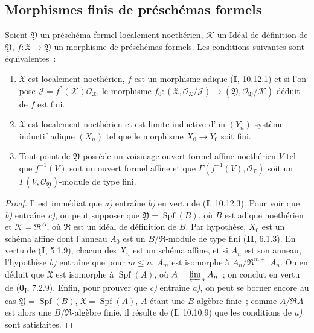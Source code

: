 \subsection{Morphismes finis de préschémas formels}

\begin{proposition}[4.8.1]
\label{III.4.8.1-fr}
Soient $\mathfrak Y$ un préschéma formel localement noethérien, $\mathcal K$ un
Idéal de définition de $\mathfrak Y$, $f:\mathfrak X\to\mathfrak Y$ un
morphisme de préschémas formels. Les conditions suivantes sont équivalentes~:
\begin{enumerate}
\item[a)] $\mathfrak X$ est localement noethérien, $f$ est un morphisme adique
  \textup{(\textbf{I}, 10.12.1)} et si l'on pose
  $\mathcal J=f^*(\mathcal K)\mathcal O_{\mathfrak X}$, le morphisme
  $f_0:(\mathfrak X,\mathcal O_{\mathfrak X}/\mathcal J)
  \longrightarrow
  (\mathfrak Y,\mathcal O_{\mathfrak Y}/\mathcal K)$
  déduit de $f$ est fini.
\item[b)] $\mathfrak X$ est localement noethérien et est limite inductive d'un
  $(Y_n)$-système inductif adique $(X_n)$ tel que le morphisme
  $X_0\to Y_0$ soit fini.
\item[c)] Tout point de $\mathfrak Y$ possède un voisinage ouvert formel affine
  noethérien $V$ tel que $f^{-1}(V)$ soit un ouvert formel affine et que
  $\Gamma(f^{-1}(V),\mathcal O_{\mathfrak X})$ soit un
  $\Gamma(V,\mathcal O_{\mathfrak Y})$-module de type fini.
\end{enumerate}
\end{proposition}

\begin{proof}
Il est immédiat que \emph{a)} entraîne \emph{b)} en vertu de (\textbf{I}, 10.12.3). Pour voir que \emph{b)}
entraîne \emph{c)}, on peut supposer que
$\mathfrak Y=\operatorname{Spf}(B)$, où $B$ est adique noethérien et
$\mathcal K=\mathfrak R^\Delta$, où $\mathfrak R$ est un idéal de définition
de $B$. Par hypothèse, $X_0$ est un schéma affine dont l'anneau $A_0$ est un
$B/\mathfrak R$-module de type fini (\textbf{II}, 6.1.3). En vertu de (\textbf{I}, 5.1.9), chacun
des $X_n$ est un schéma affine, et si $A_n$ est son anneau, l'hypothèse \emph{b)}
entraîne que pour $m\leq n$, $A_m$ est isomorphe à
$A_n/\mathfrak R^{m+1}A_n$. On en déduit que $\mathfrak X$ est isomorphe à
$\operatorname{Spf}(A)$, où $A=\varprojlim_n A_n$~; on conclut en vertu de
(\textbf{0}\textsubscript{I}, 7.2.9). Enfin, pour prouver que \emph{c)}
entraîne \emph{a)}, on peut se borner encore au cas
$\mathfrak Y=\operatorname{Spf}(B)$, $\mathfrak X=\operatorname{Spf}(A)$,
$A$ étant une $B$-algèbre finie~; comme $A/\mathfrak RA$ est alors une
$B/\mathfrak R$-algèbre finie, il résulte de (\textbf{I}, 10.10.9) que les conditions
de \emph{a)} sont satisfaites.
\end{proof}

